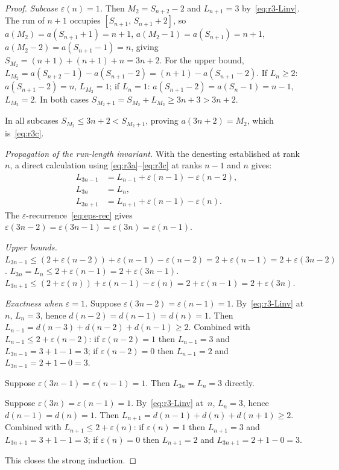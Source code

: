\documentclass[12pt]{article}
\theoremstyle{definition}
\theoremstyle{remark}
\begin{document}
\begin{proof}
\textit{Subcase $\varepsilon(n)=1$.}
Then $M_2=S_{n+2}-2$ and $L_{n+1}=3$ by~\eqref{eq:r3-Linv}.
The run of $n+1$ occupies $[S_{n+1},\,S_{n+1}+2]$, so
$a(M_2)=a(S_{n+1}+1)=n+1$,
$a(M_2-1)=a(S_{n+1})=n+1$,
$a(M_2-2)=a(S_{n+1}-1)=n$,
giving $S_{M_2}=(n+1)+(n+1)+n=3n+2$.
For the upper bound,
$L_{M_2}=a(S_{n+2}-1)-a(S_{n+1}-2)=(n+1)-a(S_{n+1}-2)$.
If $L_n\ge 2$: $a(S_{n+1}-2)=n$, $L_{M_2}=1$;
if $L_n=1$: $a(S_{n+1}-2)=a(S_n-1)=n-1$, $L_{M_2}=2$.
In both cases $S_{M_2+1}=S_{M_2}+L_{M_2}\ge 3n+3>3n+2$.

In all subcases $S_{M_2}\le 3n+2<S_{M_2+1}$,
proving $a(3n+2)=M_2$, which is~\eqref{eq:r3c}.

\textit{Propagation of the run-length invariant.}
With the denesting established at rank~$n$, a direct calculation
using \eqref{eq:r3a}--\eqref{eq:r3c} at ranks $n-1$ and $n$ gives:
\begin{align}
  L_{3n-1} &= L_{n-1}+\varepsilon(n-1)-\varepsilon(n-2),\label{eq:Lprop1}\\
  L_{3n}   &= L_n,                                       \label{eq:Lprop2}\\
  L_{3n+1} &= L_{n+1}+\varepsilon(n-1)-\varepsilon(n).   \label{eq:Lprop3}
\end{align}
The $\varepsilon$-recurrence~\eqref{eq:eps-rec} gives
$\varepsilon(3n-2)=\varepsilon(3n-1)=\varepsilon(3n)=\varepsilon(n-1)$.

\emph{Upper bounds.}
$L_{3n-1}\le(2+\varepsilon(n-2))+\varepsilon(n-1)-\varepsilon(n-2)=2+\varepsilon(n-1)=2+\varepsilon(3n-2)$.
$L_{3n}=L_n\le 2+\varepsilon(n-1)=2+\varepsilon(3n-1)$.
$L_{3n+1}\le(2+\varepsilon(n))+\varepsilon(n-1)-\varepsilon(n)=2+\varepsilon(n-1)=2+\varepsilon(3n)$.

\emph{Exactness when $\varepsilon=1$.}
Suppose $\varepsilon(3n-2)=\varepsilon(n-1)=1$.
By~\eqref{eq:r3-Linv} at~$n$, $L_n=3$, hence $d(n-2)=d(n-1)=d(n)=1$.
Then $L_{n-1}=d(n-3)+d(n-2)+d(n-1)\ge 2$.
Combined with $L_{n-1}\le 2+\varepsilon(n-2)$:
if $\varepsilon(n-2)=1$ then $L_{n-1}=3$ and $L_{3n-1}=3+1-1=3$;
if $\varepsilon(n-2)=0$ then $L_{n-1}=2$ and $L_{3n-1}=2+1-0=3$.

Suppose $\varepsilon(3n-1)=\varepsilon(n-1)=1$.
Then $L_{3n}=L_n=3$ directly.

Suppose $\varepsilon(3n)=\varepsilon(n-1)=1$.
By~\eqref{eq:r3-Linv} at~$n$, $L_n=3$, hence $d(n-1)=d(n)=1$.
Then $L_{n+1}=d(n-1)+d(n)+d(n+1)\ge 2$.
Combined with $L_{n+1}\le 2+\varepsilon(n)$:
if $\varepsilon(n)=1$ then $L_{n+1}=3$ and $L_{3n+1}=3+1-1=3$;
if $\varepsilon(n)=0$ then $L_{n+1}=2$ and $L_{3n+1}=2+1-0=3$.

This closes the strong induction.
\end{proof}
\end{document}
